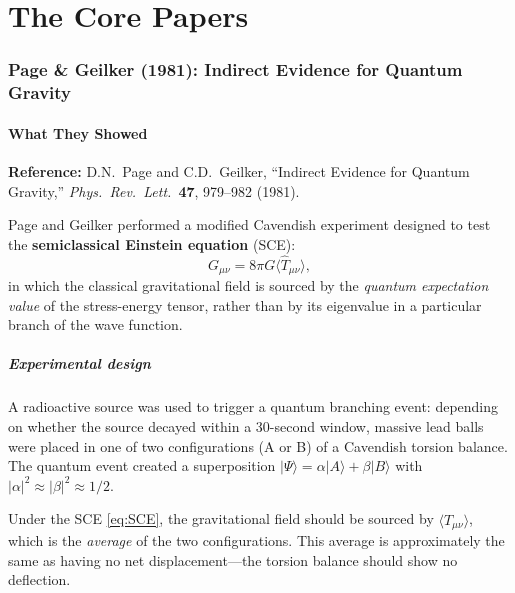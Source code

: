 \documentclass[12pt,a4paper]{article}
\begin{document}
\part{The Core Papers}

\section{Page \& Geilker (1981): Indirect Evidence for Quantum Gravity}
\label{sec:page-geilker}

\subsection{What They Showed}

\textbf{Reference:} D.N.\ Page and C.D.\ Geilker, ``Indirect Evidence for Quantum Gravity,'' \textit{Phys.\ Rev.\ Lett.}\ \textbf{47}, 979--982 (1981).

Page and Geilker performed a modified Cavendish experiment designed to test the \textbf{semiclassical Einstein equation} (SCE):
\begin{equation}\label{eq:SCE}
G_{\mu\nu} = 8\pi G \langle \hat{T}_{\mu\nu} \rangle,
\end{equation}
in which the classical gravitational field is sourced by the \emph{quantum expectation value} of the stress-energy tensor, rather than by its eigenvalue in a particular branch of the wave function.

\subsubsection{Experimental design}

A radioactive source was used to trigger a quantum branching event: depending on whether the source decayed within a 30-second window, massive lead balls were placed in one of two configurations (A or B) of a Cavendish torsion balance. The quantum event created a superposition $|\Psi\rangle = \alpha |A\rangle + \beta |B\rangle$ with $|\alpha|^2 \approx |\beta|^2 \approx 1/2$.

Under the SCE \eqref{eq:SCE}, the gravitational field should be sourced by $\langle \hat{T}_{\mu\nu}\rangle$, which is the \emph{average} of the two configurations. This average is approximately the same as having no net displacement---the torsion balance should show no deflection.
\end{document}
